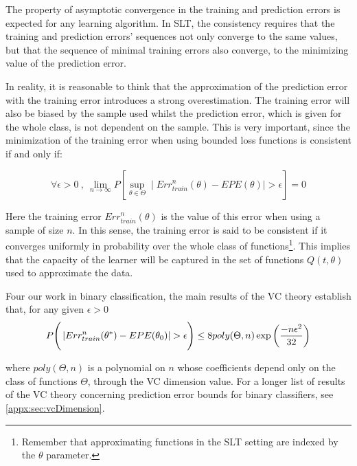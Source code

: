 The property of asymptotic convergence in the training and prediction errors is expected for any learning algorithm.
In SLT, the consistency requires that the training and prediction errors' sequences not only converge to the same values, but that the sequence of minimal training errors also converge, to the minimizing value of the prediction error.

In reality, it is reasonable to think that the approximation of the prediction error with the training error introduces a strong overestimation.
The training error will also be biased by the sample used whilst the prediction error, which is given for the whole class, is not dependent on the sample.
This is very important, since the minimization of the training error when using bounded loss functions is consistent if and only if:


\begin{equation}
\forall \epsilon > 0 \ , \ \lim_{n\to\infty} P\left[ \sup_{\theta \in \Theta} \mid Err^{n}_{train}(\theta) - EPE(\theta) \mid  > \epsilon  \right] = 0
\end{equation}

Here the training error $Err^{n}_{train}(\theta)$ is the value of this error when using a sample of size $n$.
In this sense, the training error is said to be consistent if it converges uniformly in probability over the whole class of functions\footnote{Remember that approximating functions in the SLT setting are indexed by the $\theta$ parameter.}.
This implies that the capacity of the learner will be captured in the set of functions $Q(t,\theta)$ used to approximate the data.


	Four our work in binary classification, the main results of the VC theory establish that, for any given $\epsilon > 0$
\begin{equation}
P\Bigg(  \left|  Err^n_{train}(\theta^*) - EPE(\theta_0) \right| > \epsilon \Bigg)  \leq 8 poly(\Theta,n) \exp{\large \left( {\frac{-n\epsilon^2}{32}} \right)  }
\end{equation}\label{eq:vapnik-binaryBoundProbability}

where $poly(\Theta,n)$ is a polynomial on $n$ whose coefficients depend only on the class of functions $\Theta$, through the VC dimension value. For a longer list of results of the VC theory concerning prediction error bounds for binary classifiers, see \cref{appx:sec:vcDimension}.

